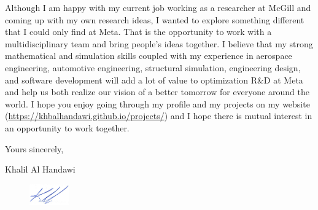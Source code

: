 \documentclass[12pt]{article} %
\begin{document}
\medskip %

Although I am happy with my current job working as a researcher at McGill and coming up with my own research ideas, I wanted to explore something different that I could only find at Meta. That is the opportunity to work with a multidisciplinary team and bring people's ideas together. I believe that my strong mathematical and simulation skills coupled with my experience in aerospace engineering, automotive engineering, structural simulation, engineering design, and software development will add a lot of value to optimization R\&D at Meta and help us both realize our vision of a better tomorrow for everyone around the world. I hope you enjoy going through my profile and my projects on my website (\href{https://khbalhandawi.github.io/projects/}{https://khbalhandawi.github.io/projects/}) and I hope there is mutual interest in an opportunity to work together.

\medskip %

Yours sincerely,

\medskip %

Khalil Al Handawi

\begin{figure}[h]
	\includegraphics[width=0.15\textwidth]{Signiture.png}
\end{figure}

\medskip %

\end{document}
